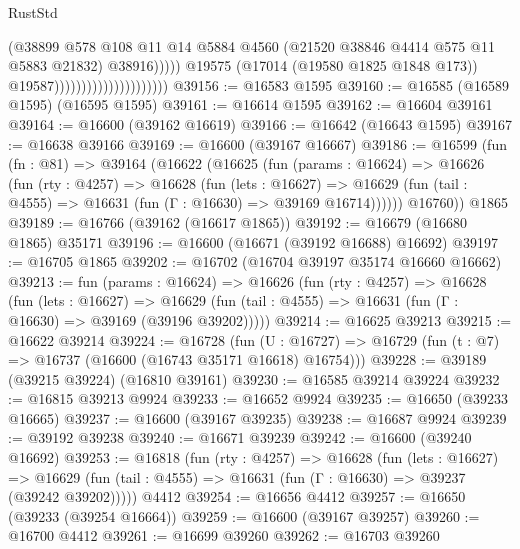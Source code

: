 \begin{lexlean}{RustStd}
\begin{coremodule}
                                                      (@38899
                                                        @578
                                                        @108
                                                        @11
                                                        @14
                                                        @5884
                                                        @4560
                                                        (@21520 @38846 @4414 @575 @11 @5883 @21832)
                                                        @38916)))))
                                              @19575
                                              (@17014 (@19580 @1825 @1848 @173))
                                              @19587)))))))))))))))))))))
@39156 := @16583 @1595
@39160 := @16585 (@16589 @1595) (@16595 @1595)
@39161 := @16614 @1595
@39162 := @16604 @39161
@39164 := @16600 (@39162 @16619)
@39166 := @16642 (@16643 @1595)
@39167 := @16638 @39166
@39169 := @16600 (@39167 @16667)
@39186 := @16599
    (fun (fn : @81) =>
    @39164
      (@16622
        (@16625
          (fun (params : @16624) =>
          @16626
            (fun (rty : @4257) =>
            @16628
              (fun (lets : @16627) =>
              @16629 (fun (tail : @4555) => @16631 (fun (Γ : @16630) => @39169 @16714))))))
        @16760))
    @1865
@39189 := @16766 (@39162 (@16617 @1865))
@39192 := @16679 (@16680 @1865) @35171
@39196 := @16600 (@16671 (@39192 @16688) @16692)
@39197 := @16705 @1865
@39202 := @16702 (@16704 @39197 @35174 @16660 @16662)
@39213 := fun (params : @16624) =>
  @16626
    (fun (rty : @4257) =>
    @16628
      (fun (lets : @16627) =>
      @16629 (fun (tail : @4555) => @16631 (fun (Γ : @16630) => @39169 (@39196 @39202)))))
@39214 := @16625 @39213
@39215 := @16622 @39214
@39224 := @16728
    (fun (U : @16727) => @16729 (fun (t : @7) => @16737 (@16600 (@16743 @35171 @16618) @16754)))
@39228 := @39189 (@39215 @39224) (@16810 @39161)
@39230 := @16585 @39214 @39224
@39232 := @16815 @39213 @9924
@39233 := @16652 @9924
@39235 := @16650 (@39233 @16665)
@39237 := @16600 (@39167 @39235)
@39238 := @16687 @9924
@39239 := @39192 @39238
@39240 := @16671 @39239
@39242 := @16600 (@39240 @16692)
@39253 := @16818
    (fun (rty : @4257) =>
    @16628
      (fun (lets : @16627) =>
      @16629 (fun (tail : @4555) => @16631 (fun (Γ : @16630) => @39237 (@39242 @39202)))))
    @4412
@39254 := @16656 @4412
@39257 := @16650 (@39233 (@39254 @16664))
@39259 := @16600 (@39167 @39257)
@39260 := @16700 @4412
@39261 := @16699 @39260
@39262 := @16703 @39260

\end{coremodule}
\end{lexlean}
